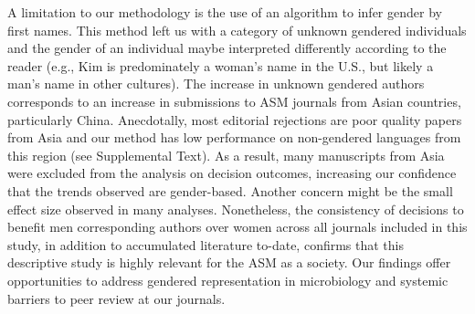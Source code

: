 \documentclass[11pt,]{article}
\begin{document}
A limitation to our methodology is the use of an algorithm to infer
gender by first names. This method left us with a category of unknown
gendered individuals and the gender of an individual maybe interpreted
differently according to the reader (e.g., Kim is predominately a
woman's name in the U.S., but likely a man's name in other cultures).
The increase in unknown gendered authors corresponds to an increase in
submissions to ASM journals from Asian countries, particularly China.
Anecdotally, most editorial rejections are poor quality papers from Asia
and our method has low performance on non-gendered languages from this
region (see Supplemental Text). As a result, many manuscripts from Asia
were excluded from the analysis on decision outcomes, increasing our
confidence that the trends observed are gender-based. Another concern
might be the small effect size observed in many analyses. Nonetheless,
the consistency of decisions to benefit men corresponding authors over
women across all journals included in this study, in addition to
accumulated literature to-date, confirms that this descriptive study is
highly relevant for the ASM as a society. Our findings offer
opportunities to address gendered representation in microbiology and
systemic barriers to peer review at our journals.
\end{document}
